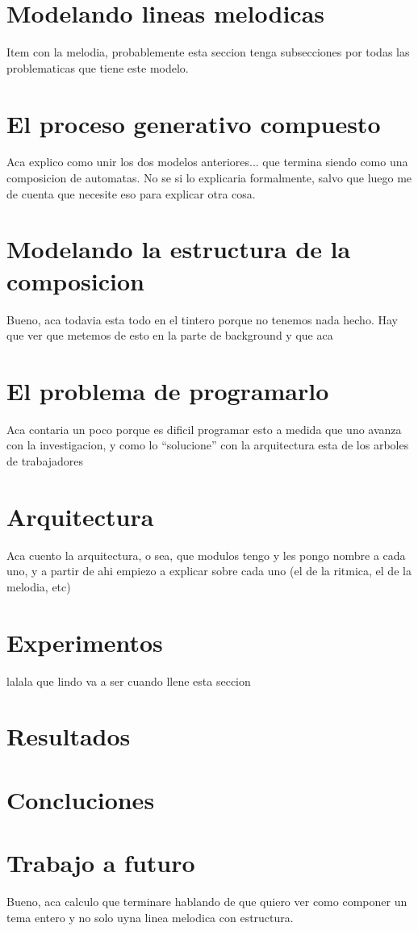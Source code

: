 \documentclass[a4paper,11pt]{article}
\begin{document}
\section{Modelando lineas melodicas}
Item con la melodia, probablemente esta seccion tenga subsecciones por todas las problematicas que tiene este modelo.

\section{El proceso generativo compuesto}
Aca explico como unir los dos modelos anteriores... que termina siendo como una composicion de automatas. No se si lo explicaria
formalmente, salvo que luego me de cuenta que necesite eso para explicar otra cosa.

\section{Modelando la estructura de la composicion}
Bueno, aca todavia esta todo en el tintero porque no tenemos nada hecho. Hay que ver que metemos de esto en la parte
de background y que aca

\section{El problema de programarlo}
Aca contaria un poco porque es dificil programar esto a medida que uno avanza con la investigacion, y como lo ``solucione''
con la arquitectura esta de los arboles de trabajadores

\section{Arquitectura}
Aca cuento la arquitectura, o sea, que modulos tengo y les pongo nombre a cada uno, y a partir de ahi empiezo a explicar
sobre cada uno (el de la ritmica, el de la melodia, etc)

\section{Experimentos}
lalala que lindo va a ser cuando llene esta seccion

\section{Resultados}

\section{Concluciones}

\section{Trabajo a futuro}
Bueno, aca calculo que terminare hablando de que quiero ver como componer un tema entero y no solo uyna linea melodica con 
estructura.
\end{document}
